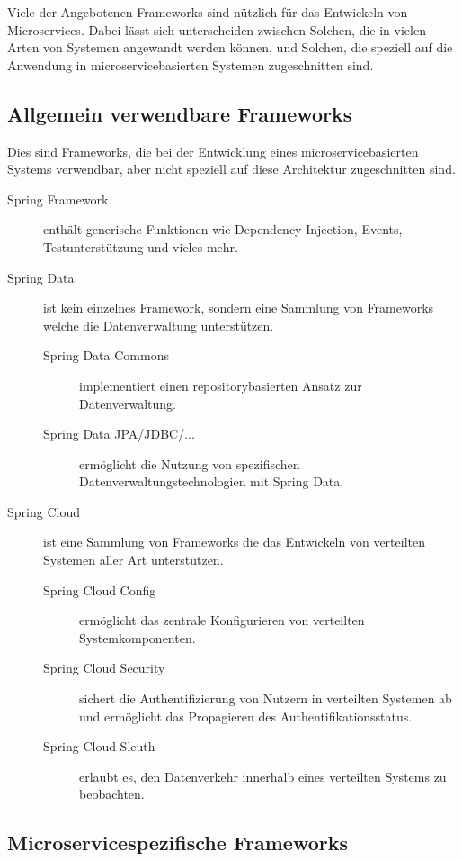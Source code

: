 \documentclass{article}
\begin{document}
Viele der Angebotenen Frameworks sind nützlich für das Entwickeln von Microservices.
Dabei lässt sich unterscheiden zwischen Solchen, die in vielen Arten von Systemen angewandt werden können, und Solchen, die speziell auf die Anwendung in microservicebasierten Systemen zugeschnitten sind.

\subsection{Allgemein verwendbare Frameworks}

Dies sind Frameworks, die bei der Entwicklung eines microservicebasierten Systems verwendbar, aber nicht speziell auf diese Architektur zugeschnitten sind.

\begin{description}
    \item[Spring Framework] enthält generische Funktionen wie Dependency Injection, Events, Testunterstützung und vieles mehr.
    \item[Spring Data] ist kein einzelnes Framework, sondern eine Sammlung von Frameworks welche die Datenverwaltung unterstützen.
    \begin{description}
        \item[Spring Data Commons] implementiert einen repositorybasierten Ansatz zur Datenverwaltung.
        \item[Spring Data JPA/JDBC/...] ermöglicht die Nutzung von spezifischen Datenverwaltungstechnologien mit Spring Data.
    \end{description}

    \item[Spring Cloud] ist eine Sammlung von Frameworks die das Entwickeln von verteilten Systemen aller Art unterstützen.
    \begin{description}
        \item[Spring Cloud Config] ermöglicht das zentrale Konfigurieren von verteilten Systemkomponenten.
        \item[Spring Cloud Security] sichert die Authentifizierung von Nutzern in verteilten Systemen ab und ermöglicht das Propagieren des Authentifikationsstatus.
        \item[Spring Cloud Sleuth] erlaubt es, den Datenverkehr innerhalb eines verteilten Systems zu beobachten.
    \end{description}
\end{description}

\subsection{Microservicespezifische Frameworks}
\end{document}

